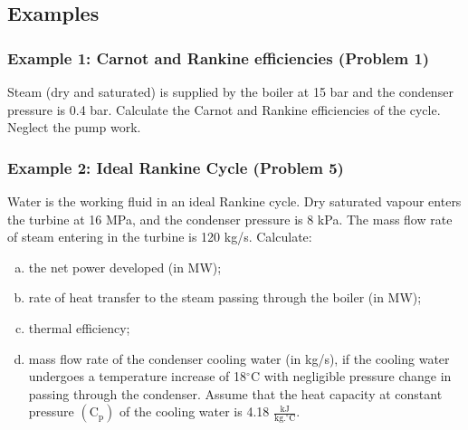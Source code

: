 \documentclass[10pt,compress,handout,ignorenonframetext]{beamer}
\begin{document}
\begin{frame}
\begin{columns}
\begin{column}[c]{0.5\linewidth}
{\begin{figure}
\begin{center}
           \end{center}
         \end{figure}}
      \end{column}
   \end{columns}
 \normalsize
\end{frame}

\subsection{Examples}

\begin{frame}
 \frametitle{Example 1: Carnot and Rankine efficiencies (Problem 1)}
    Steam (dry and saturated) is supplied by the boiler at 15 bar and the condenser pressure is 0.4 bar. Calculate the Carnot and Rankine efficiencies of the cycle. Neglect the pump work.
\end{frame}

\begin{frame}
 \frametitle{Example 2: Ideal Rankine Cycle (Problem 5)}
Water is the working fluid in an ideal Rankine cycle. Dry saturated vapour enters the turbine at 16 MPa, and the condenser pressure is 8 kPa. The mass flow rate of steam entering in the turbine is 120 kg/s. Calculate:
\begin{enumerate}[(a)]
\item the net power developed (in MW);
\item rate of heat transfer to the steam passing through the boiler (in MW);
\item thermal efficiency;
\item mass flow rate of the condenser cooling water (in kg/s), if the cooling water undergoes a temperature increase of 18$^{\circ}$C with negligible pressure change in passing through the condenser. Assume that the heat capacity at constant pressure $\left(\text{C}_{\text{p}}\right)$ of the cooling water is 4.18 $\frac{\text{kJ}}{\text{kg.}^{\circ}\text{C}}$.
\end{enumerate} 
\end{frame}
\end{document}
